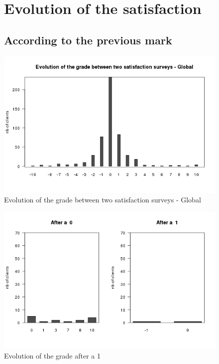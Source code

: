 \documentclass[a4paper, 11pt]{article}
\begin{document}
\clearpage

	\begin{figure}[!ht]
			\section{Evolution of the satisfaction}
		\label{app:evolution}
			\subsection{According to the previous mark}
		
            \centering
            \includegraphics[height = 10 cm]{Remi/Evolution_of_the_grade_between_two_satisfaction_surveys_-_Global.png}
            \caption{Evolution of the grade between two satisfaction surveys - Global}
            \label{fig:e_Global}
    \end{figure}

    \begin{figure}[!ht]
            \centering
            \includegraphics[height = 10 cm]{Remi/Evolution_of_the_grade_after_a_1.png}
            \caption{Evolution of the grade after a 1}
            \label{fig:e_1}
    \end{figure}
\end{document}
